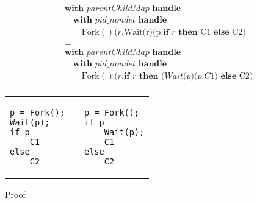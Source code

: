 \documentclass[logo,bsc,singlespacing,parskip]{infthesis}
\begin{document}
\[
\begin{array}{l}
\textbf{with } \mathit{parentChildMap} \textbf{ handle } \\
\quad\textbf{with } \mathit{pid\_nondet} \textbf{ handle } \\
\quad\quad \text{Fork}()(r. \text{Wait(r)(p.} \textbf{if } r  \textbf{ then } \text{C1} \textbf{ else } \text{C2)} \\[5pt]
\equiv \\
\textbf{with } \mathit{parentChildMap} \textbf{ handle } \\
\quad\textbf{with } \mathit{pid\_nondet} \textbf{ handle } \\\quad\quad \text{Fork}()(r. \textbf{if } r 
\textbf{ then } (\textit{Wait(p)(p.C1)} \textbf{ else } \text{C2)} \\[5pt]

\end{array}
\]




\vspace{-2em}
\begin{table}[H]
\centering
\begin{tabular}{p{} c p{}}
\begin{lstlisting}
p = Fork();
Wait(p);
if p
    C1
else
    C2
\end{lstlisting}
&
&
\begin{lstlisting}
p = Fork();
if p
    Wait(p);
    C1
else
    C2
\end{lstlisting}
\end{tabular}
\end{table}
\vspace{-2em}

\underline{Proof}
\end{document}
